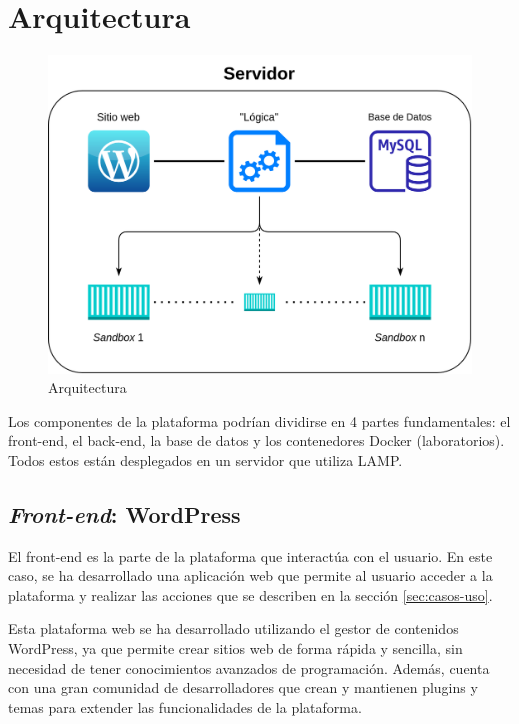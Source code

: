     
    \section{Arquitectura}
        \label{sec:arquitectura}
        
        \begin{figure}[h]
            \centering
            \includegraphics[scale=0.20]{images/Diagramas/Arquitectura.png}
            \caption{Arquitectura}
            \label{fig:arquitectura}
        \end{figure}

        Los componentes de la plataforma podrían dividirse en 4 partes fundamentales: el front-end, el back-end, la base de datos y los contenedores Docker (laboratorios). Todos estos están desplegados en un servidor que utiliza LAMP.

        \subsection{\textit{Front-end}: WordPress}

            El front-end es la parte de la plataforma que interactúa con el usuario. En este caso, se ha desarrollado una aplicación web que permite al usuario acceder a la plataforma y realizar las acciones que se describen en la sección \ref{sec:casos-uso}.
            
            Esta plataforma web se ha desarrollado utilizando el gestor de contenidos WordPress, ya que permite crear sitios web de forma rápida y sencilla, sin necesidad de tener conocimientos avanzados de programación. Además, cuenta con una gran comunidad de desarrolladores que crean y mantienen plugins y temas para extender las funcionalidades de la plataforma.


